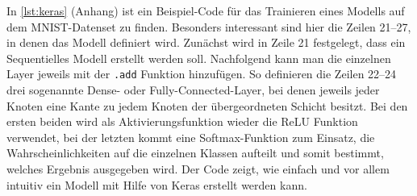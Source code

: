 In \autoref{lst:keras} (Anhang) ist ein Beispiel-Code für das Trainieren eines Modells auf dem MNIST-Datenset zu finden. Besonders interessant sind hier die Zeilen 21--27, in denen das Modell definiert wird. Zunächst wird in Zeile 21 festgelegt, dass ein Sequentielles Modell erstellt werden soll. Nachfolgend kann man die einzelnen Layer jeweils mit der \lstinline$.add$ Funktion hinzufügen. So definieren die Zeilen 22--24 drei sogenannte Dense- oder Fully-Connected-Layer, bei denen jeweils jeder Knoten eine Kante zu jedem Knoten der übergeordneten Schicht besitzt. Bei den ersten beiden wird als Aktivierungsfunktion wieder die \gls{ReLU} Funktion verwendet, bei der letzten kommt eine Softmax-Funktion zum Einsatz, die Wahrscheinlichkeiten auf die einzelnen Klassen aufteilt und somit bestimmt, welches Ergebnis ausgegeben wird. Der Code zeigt, wie einfach und vor allem intuitiv ein Modell mit Hilfe von Keras erstellt werden kann.